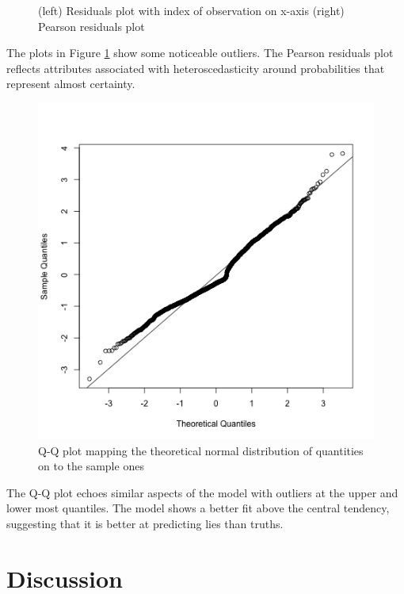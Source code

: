 \documentclass[man, floatsintext]{apa7}
\begin{document}
\begin{figure}[H]
	\caption{(left) Residuals plot with index of observation on x-axis (right) Pearson residuals plot}
	\label{fig:Residuals}
\end{figure}

The plots in Figure \ref{fig:Residuals} show some noticeable outliers. The Pearson residuals plot reflects attributes associated with heteroscedasticity around probabilities that represent almost certainty.

\begin{figure}[H]
	\centering
	\includegraphics[width=0.5\linewidth]{../plots/R/qqline}
	\caption{Q-Q plot mapping the theoretical normal distribution of quantities on to the sample ones}
	\label{fig:qqline}
\end{figure}

The Q-Q plot echoes similar aspects of the model with outliers at the upper and lower most quantiles. The model shows a better fit above the central tendency, suggesting that it is better at predicting lies than truths.

\section{Discussion}



\end{document}
